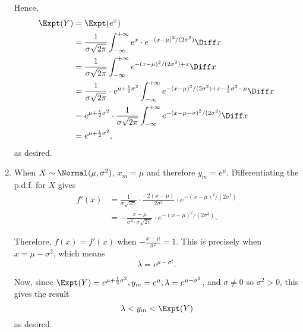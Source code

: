 \begin{enumerate}
          Hence,
          \begin{align*}
              \Expt(Y) & = \Expt(e^x)                                                                                                                                                       \\
                       & = \frac{1}{\sigma\sqrt{2\pi}} \int_{-\infty}^{+\infty} e^x \cdot e^{-(x - \mu)^2 / (2\sigma^2)} \Diff x                                                            \\
                       & = \frac{1}{\sigma\sqrt{2\pi}} \int_{-\infty}^{+\infty} e^{- (x - \mu)^2 / (2\sigma^2) + x} \Diff x                                                                 \\
                       & = \frac{1}{\sigma\sqrt{2\pi}} \cdot e^{\mu + \frac{1}{2}\sigma^2} \int_{-\infty}^{+\infty} e^{- (x - \mu)^2 / (2\sigma^2) + x - \frac{1}{2}\sigma^2 - \mu} \Diff x \\
                       & = e^{\mu + \frac{1}{2}\sigma^2} \cdot \frac{1}{\sigma\sqrt{2\pi}} \int_{-\infty}^{+\infty} e^{-(x - \mu - \sigma)^2 / (2\sigma^2)} \Diff x                         \\
                       & = e^{\mu + \frac{1}{2}\sigma^2},
          \end{align*}
          as desired.

    \item When \(X \sim \Normal(\mu, \sigma^2)\), \(x_m = \mu\) and therefore \(y_m = e^\mu\). Differentiating the p.d.f. for \(X\) gives
          \begin{align*}
              f'(x) & = \frac{1}{\sigma\sqrt{2\pi}} \cdot \frac{-2(x - \mu)}{2\sigma^2} \cdot e^{-(x - \mu)^2 / (2\sigma^2)} \\
                    & = - \frac{x - \mu}{\sigma^2 \cdot \sigma\sqrt{2\pi}} \cdot e^{-(x - \mu)^2 / (2\sigma^2)}.
          \end{align*}

          Therefore, \(f(x) = f'(x)\) when \(-\frac{x - \mu}{\sigma^2} = 1\). This is precisely when \(x = \mu - \sigma^2\), which means
          \[
              \lambda = e^{\mu - \sigma^2}.
          \]

          Now, since \(\Expt(Y) = e^{\mu + \frac{1}{2}\sigma^2}, y_m = e^\mu, \lambda = e^{\mu - \sigma^2}\), and \(\sigma \neq 0\) so \(\sigma^2 > 0\), this gives the result
          \[
              \lambda < y_m < \Expt(Y)
          \]
          as desired.
\end{enumerate}